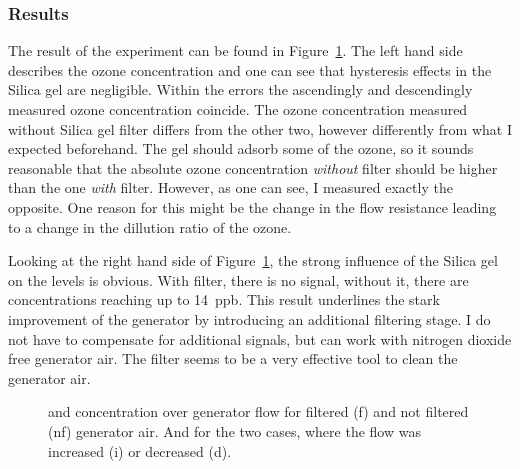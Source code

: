 \subsubsection{Results}
\label{sec:silica-results}

The result of the experiment can be found in
Figure~\ref{fig:o3-flow}. The left hand side describes the ozone
concentration and one can see that hysteresis effects in the Silica gel
are negligible. Within the errors the ascendingly and descendingly
measured ozone concentration coincide. The ozone concentration
measured without Silica gel filter differs from the other two, however
differently from what I expected beforehand. The gel should adsorb
some of the ozone, so it sounds reasonable that the absolute ozone
concentration \emph{without} filter should be higher than the one
\emph{with} filter. However, as one can see, I measured exactly the
opposite. One reason for this might be the change in the flow
resistance leading to a change in the dillution ratio of the ozone.

Looking at the right hand side of Figure~\ref{fig:o3-flow}, the
strong influence of the Silica gel on the  levels is obvious. With
filter, there is no  signal, without it, there are concentrations
reaching up to \SI{14}{ppb}. This result underlines the stark
improvement of the generator by introducing an additional filtering
stage. I do not have to compensate for additional  signals,
but can work with nitrogen dioxide free generator air. The filter
seems to be a very effective tool to clean the generator air.

\begin{figure}[htbp]
  \centering
  
  \hfill
  
  \caption{ and  concentration over generator flow for
    filtered (f) and not filtered (nf) generator air. And for the two
    cases, where the flow was increased (i) or decreased (d).}
  \label{fig:o3-flow}
\end{figure}

